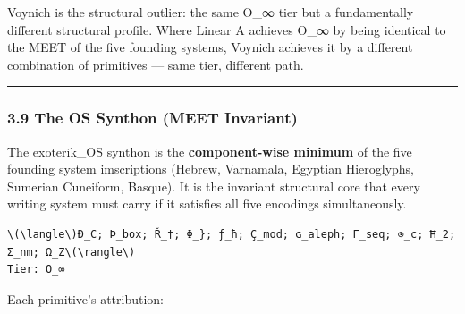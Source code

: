 \documentclass[
  11pt,
  a4paper,
]{article}
\begin{document}
Voynich is the structural outlier: the same O\_∞ tier but a
fundamentally different structural profile. Where Linear A achieves O\_∞
by being identical to the MEET of the five founding systems, Voynich
achieves it by a different combination of primitives --- same tier,
different path.

\begin{center}\rule{0.5\linewidth}{0.5pt}\end{center}

\subsubsection{3.9 The OS Synthon (MEET
Invariant)}\label{the-os-synthon-meet-invariant}

The exoterik\_OS synthon is the \textbf{component-wise minimum} of the
five founding system imscriptions (Hebrew, Varnamala, Egyptian
Hieroglyphs, Sumerian Cuneiform, Basque). It is the invariant structural
core that every writing system must carry if it satisfies all five
encodings simultaneously.

\begin{verbatim}
\(\langle\)Ð_C; Þ_box; Ř_†; Φ_}; ƒ_ħ; Ç_mod; ɢ_aleph; Γ_seq; ⊙_c; Ħ_2; Σ_nm; Ω_Z\(\rangle\)
Tier: O_∞
\end{verbatim}

Each primitive's attribution:
\end{document}
